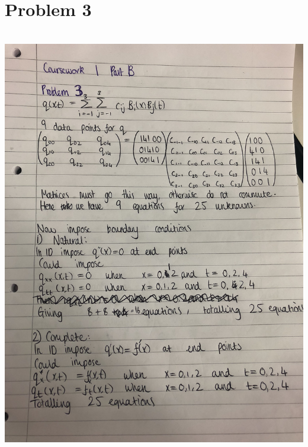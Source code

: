 \documentclass[a4paper,12pt,onecolumn,final]{article}
\begin{document}
\section*{Problem 3}

\\
\includegraphics[scale=0.3]{cw1bQ3.jpg} 

\end{document}
